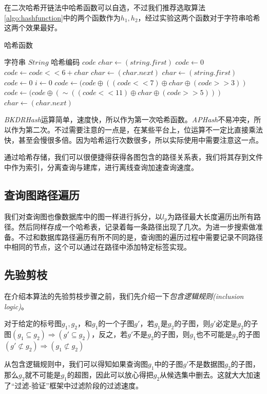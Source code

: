 \documentclass{XDBAthesis}
\numberwithin{algorithm}{chapter}
\begin{document}
在二次哈希开链法中哈希函数可以自选，不过我们推荐选取算法\ref{algo:hashfunction}中的两个函数作为$h_1 ,h_2 $，经过实验这两个函数对于字符串哈希这两个效果最好。

\begin{algorithm}
\caption{哈希函数}
\label{algo:hashfunction}
\begin{algorithmic}[1]
    \Require 字符串 $String$
    \Ensure 哈希编码 $code$
        \State $char \gets (string.first)$
        \State $code \gets 0$
            \State $code \gets code<<6+char$
            \State $char \gets (char.next)$
        \EndWhile
        \State {}
    \EndFunction
        \State $char \gets (string.first)$
        \State $code \gets 0$
        \State $i \gets 0 $
                \State $code \gets (code\oplus ((code<<7)\oplus char\oplus (code>>3))$
            \Else
                \State $code \gets (code\oplus (\sim ((code<<11)\oplus char\oplus (code>>5)))  $
            \EndIf
            \State $char \gets (char.next)$
        \EndWhile
        \State {}
    \EndFunction          
\end{algorithmic}
\end{algorithm}

\emph{BKDRHash}运算简单，速度快，所以作为第一次哈希函数。\emph{APHash}不易冲突，所以作为第二次。不过需要注意的一点是，在某些平台上，位运算不一定比直接乘法快，甚至会慢很多倍。因为哈希运行次数很多，所以实际使用中需要注意这一点。

通过哈希存储，我们可以很便捷得获得各图包含的路径关系表，我们将其存到文件中作为索引，分离查询与建库，进行离线查询加速查询速度。

\subsection{查询图路径遍历}
我们对查询图也像数据库中的图一样进行拆分，以$l_p $为路径最大长度遍历出所有路径。然后同样存成一个哈希表，记录着每一条路径出现了几次。为进一步搜索做准备。不过和数据库路径遍历有所不同的是，查询图的遍历过程中需要记录不同路径中相同的节点，这个可以通过在路径中添加特定标签实现。
\subsection{先验剪枝}
    在介绍本算法的先验剪枝步骤之前，我们先介绍一下\emph{包含逻辑规则(inclusion logic)}。
    \begin{defn}[包含逻辑]\cite{inclusionlogic}
        对于给定的标号图$g_1 ,g_2 $，和$g_1 $的一个子图$g'$，若$g_1 $是$g_2 $的子图，则$g'$必定是$g_2 $的子图$(g_1 \subseteq g_2 ) \Rightarrow (g' \subseteq g_2  )$，反之，若$g'$不是$g_2 $的子图，则$g_1 $也不可能是$g_2 $的子图$(g' \not\subset g_2  )\Rightarrow (g_1 \not\subset g_2 )$    
    \end{defn}
    从包含逻辑规则中，我们可以得知如果查询图$g_1 $中的子图$g'$不是数据图$g_2 $的子图，那么$g_2 $就不可能是$g_1 $的超图，因此可以放心得把$g_2 $从候选集中删去。这就大大加速了“过滤-验证”框架中过滤阶段的过滤速度。
    
\end{document}
